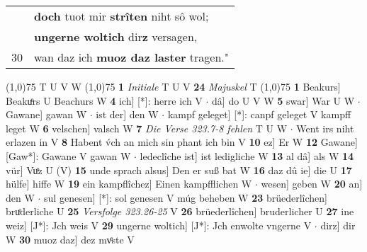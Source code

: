 \documentclass[8pt,a4paper,notitlepage]{article}
\begin{document}
\begin{table}[ht]
\begin{minipage}[t]{0.5\linewidth}
\begin{tabular}{rl}
 & \textbf{doch} tuot mir \textbf{strîten} niht sô wol;\\ 
 & \textbf{ungerne woltich} dir\textbf{z} versagen,\\ 
30 & wan daz ich \textbf{muoz daz laster} tragen."\\ 
\end{tabular}
\scriptsize
\line(1,0){75} \newline
T U V W \newline
\line(1,0){75} \newline
\textbf{1} \textit{Initiale} T U V  \textbf{24} \textit{Majuskel} T  \newline
\line(1,0){75} \newline
\textbf{1} Beakurs] Beakuͦrs U Beachurs W \textbf{4} ich] [*]: herre ich V  $\cdot$ dâ] do U V W \textbf{5} swar] War U W  $\cdot$ Gawane] gawan W  $\cdot$ ist der] den W  $\cdot$ kampf geleget] [*]: canpf geleget V kampff leget W \textbf{6} velschen] valsch W \textbf{7} \textit{Die Verse 323.7-8 fehlen} T U W   $\cdot$ Went irs niht erlazen in V \textbf{8} Habent v́ch an mich sin phant ich bin V \textbf{10} ez] Er W \textbf{12} Gawane] [Gaw*]: Gawane V gawan W  $\cdot$ ledeclîche ist] ist ledigliche W \textbf{13} al dâ] als W \textbf{14} vür] Vuͦz U (V) \textbf{15} unde sprach alsus] Den er suß bat W \textbf{16} daz dû ie] die U \textbf{17} hülfe] hiffe W \textbf{19} ein kampflîchez] Einen kampfflichen W  $\cdot$ wesen] geben W \textbf{20} an] den W  $\cdot$ sul genesen] [*]: sol genesen V múg beheben W \textbf{23} brüederlîchen] bruͦderliche U \textbf{25} \textit{Versfolge 323.26-25} V  \textbf{26} brüederlîchen] bruderlicher U \textbf{27} ine weiz] [J*]: Jch weis V \textbf{29} ungerne woltich] [J*]: Jch enwolte vngerne V  $\cdot$ dirz] dir W \textbf{30} muoz daz] dez mvͤste V \newline
\end{minipage}
\end{table}
\end{document}
